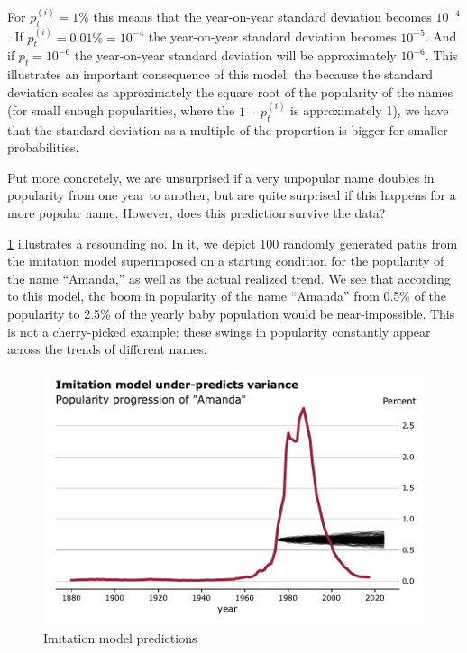 \documentclass[a4paper]{article}
\begin{document}
For $p_t^{(i)} = 1\%$ this means that the year-on-year standard deviation
becomes $10^{-4}$. If $p_t^{(i)} = 0.01\% = 10^{-4}$ the year-on-year standard
deviation becomes $10^{-5}$. And if $p_t = 10^{-6}$ the year-on-year standard
deviation will be approximately $10^{-6}$. This illustrates an important
consequence of this model: the because the standard deviation scales as
approximately the square root of the popularity of the names (for small enough
popularities, where the $1-p_t^{(i)}$ is approximately 1), we have that the
standard deviation as a multiple of the proportion is bigger for smaller
probabilities.

Put more concretely, we are unsurprised if a very unpopular name doubles in
popularity from one year to another, but are quite surprised if this happens for
a more popular name. However, does this prediction survive the data? 

\cref{fig:imitation-pred} illustrates a resounding no. In it, we depict 100
randomly generated paths from the imitation model superimposed on a starting
condition for the popularity of the name ``Amanda,'' as well as the actual
realized trend. We see that according to this model, the boom in popularity of
the name ``Amanda'' from 0.5\% of the popularity to 2.5\% of the yearly baby
population would be near-impossible. This is not a cherry-picked example: these
swings in popularity constantly appear across the trends of different names.

\begin{figure}[h]
\centering
\includegraphics[width=.9\textwidth]{figs/imitation-model}
\caption{Imitation model predictions}
\label{fig:imitation-pred}
\end{figure}
\end{document}
